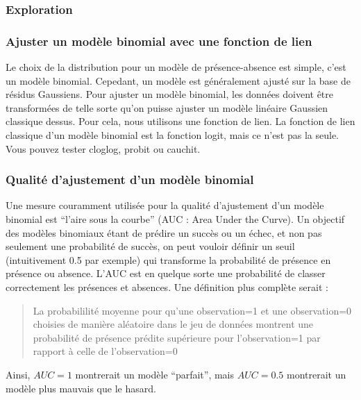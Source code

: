 \documentclass[french,a4paper]{article}
\begin{document}
\hypertarget{exploration}{%
\subsubsection{Exploration}\label{exploration}}

\hypertarget{ajuster-un-modele-binomial-avec-une-fonction-de-lien}{%
\subsubsection{Ajuster un modèle binomial avec une fonction de lien}\label{ajuster-un-modele-binomial-avec-une-fonction-de-lien}}

Le choix de la distribution pour un modèle de présence-absence est simple, c'est un modèle binomial. Cepedant, un modèle est généralement ajusté sur la base de résidus Gaussiens. Pour ajuster un modèle binomial, les données doivent être transformées de telle sorte qu'on puisse ajuster un modèle linéaire Gaussien classique dessus. Pour cela, nous utilisons une fonction de lien. La fonction de lien classique d'un modèle binomial est la fonction logit, mais ce n'est pas la seule. Vous pouvez tester cloglog, probit ou cauchit.

\hypertarget{qualite-dajustement-dun-modele-binomial}{%
\subsubsection{Qualité d'ajustement d'un modèle binomial}\label{qualite-dajustement-dun-modele-binomial}}

Une mesure couramment utilisée pour la qualité d'ajustement d'un modèle binomial est ``l'aire sous la courbe'' (AUC : Area Under the Curve). Un objectif des modèles binomiaux étant de prédire un succès ou un échec, et non pas seulement une probabilité de succès, on peut vouloir définir un seuil (intuitivement 0.5 par exemple) qui transforme la probabilité de présence en présence ou absence. L'AUC est en quelque sorte une probabilité de classer correctement les présences et absences. Une définition plus complète serait :

\begin{quote}
La probabililité moyenne pour qu'une observation=1 et une observation=0 choisies de manière aléatoire dans le jeu de données montrent une probabilité de présence prédite supérieure pour l'observation=1 par rapport à celle de l'observation=0
\end{quote}

Ainsi, \(AUC = 1\) montrerait un modèle ``parfait'', mais \(AUC = 0.5\) montrerait un modèle plus mauvais que le hasard.
\end{document}
